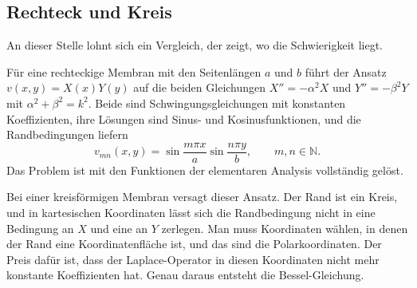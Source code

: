 \subsection{Rechteck und Kreis
\label{bessel:herleitung:subsection:rechteckkreis}}
An dieser Stelle lohnt sich ein Vergleich, der zeigt, wo die Schwierigkeit liegt.
 
Für eine rechteckige Membran mit den Seitenlängen $a$ und $b$ führt der Ansatz $v(x,y)=X(x)Y(y)$ auf die beiden Gleichungen
$X''=-\alpha^2X$ und $Y''=-\beta^2Y$ mit $\alpha^2+\beta^2=k^2$.
Beide sind Schwingungsgleichungen mit konstanten Koeffizienten, ihre Lösungen sind Sinus- und Kosinusfunktionen, und die Randbedingungen liefern
\[
v_{mn}(x,y)
=
\sin\frac{m\pi x}{a}
\sin\frac{n\pi y}{b},
\qquad
m,n \in \mathbb{N}.
\]
Das Problem ist mit den Funktionen der elementaren Analysis vollständig gelöst.
 
Bei einer kreisförmigen Membran versagt dieser Ansatz.
Der Rand ist ein Kreis, und in kartesischen Koordinaten lässt sich die Randbedingung nicht in eine Bedingung an $X$ und eine an $Y$ zerlegen.
Man muss Koordinaten wählen, in denen der Rand eine Koordinatenfläche ist, und das sind die Polarkoordinaten.
Der Preis dafür ist, dass der Laplace-Operator in diesen Koordinaten nicht mehr konstante Koeffizienten hat.
Genau daraus entsteht die Bessel-Gleichung.
%
%
